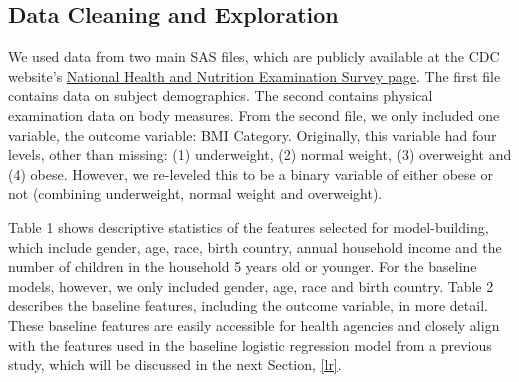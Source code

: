 \documentclass[twoside,11pt]{article}
\begin{document}
\subsection{Data Cleaning and Exploration}
We used data from two main SAS files, which are publicly available at the CDC website's \href{ https://wwwn.cdc.gov/nchs/nhanes/search/nnyfs12.aspx}{National Health and Nutrition Examination Survey page}. The first file contains data on subject demographics. The second contains physical examination data on body measures. From the second file, we only included one variable, the outcome variable: BMI Category. Originally, this variable had four levels, other than missing: (1) underweight, (2) normal weight, (3) overweight and (4) obese. However, we re-leveled this to be a binary variable of either obese or not (combining underweight, normal weight and overweight). 

Table 1 shows descriptive statistics of the features selected for model-building, which include gender, age, race, birth country, annual household income and the number of children in the household 5 years old or younger. For the baseline models, however, we only included gender, age, race and birth country. Table 2 describes the baseline features, including the outcome variable, in more detail. These baseline features are easily accessible for health agencies and closely align with the features used in the baseline logistic regression model from a previous study, which will be discussed in the next Section, \ref{lr}. 

\renewcommand\theadalign{bc}
\renewcommand\theadfont{\bfseries}
\renewcommand\theadgape{\Gape[4pt]}
\renewcommand\cellgape{\Gape[4pt]}
\end{document}

